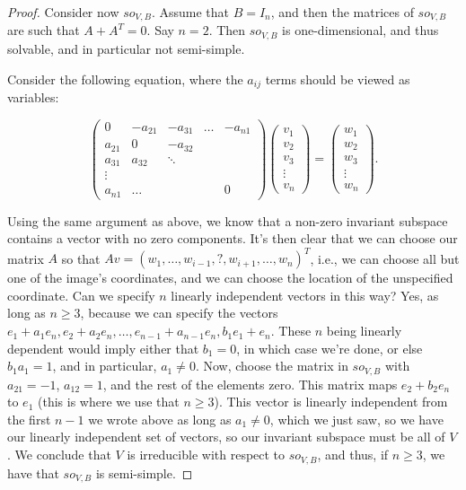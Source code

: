 \documentclass{amsart}
\begin{document}
\begin{proof}
Consider now $so_{V,B}$.  Assume that $B = I_{n}$, and then the
matrices of $so_{V,B}$ are such that $A + A^{T} = 0$.  Say $n=2$.
Then $so_{V,B}$ is one-dimensional, and thus solvable, and in
particular not semi-simple.

Consider the
following equation, where the $a_{ij}$ terms should be viewed as
variables:

$$\left( \begin{array}{ccccc}
0 & -a_{21} & -a_{31} & \ldots &- a_{n1} \\ 
a_{21} & 0 & -a_{32} & &\\
a_{31} & a_{32} & \ddots & &\\ 
\vdots & & & & \\ 
a_{n1} & \ldots & & & 0
\end{array}\right) \left( \begin{array}{c}
v_{1} \\
v_{2} \\
v_{3} \\
\vdots \\
v_{n} \end{array}\right) = \left( \begin{array}{c}
w_{1} \\
w_{2} \\
w_{3} \\
\vdots \\
w_{n} \end{array}\right).$$

Using the same argument as above, we know that a non-zero
invariant subspace contains a vector with no zero components.  It's
then clear that we can choose our matrix $A$ so that $Av = (w_{1},
\ldots, w_{i-1},?,w_{i+1},\ldots,w_{n})^{T}$, i.e., we can choose all
but one of the image's coordinates, and we can choose the location of
the unspecified coordinate.  Can we specify $n$ linearly independent
vectors in this way?  Yes, as long as $n \geq 3$, because we can
specify the vectors $e_{1} + a_{1}e_{n}, e_{2} + a_{2}e_{n}, \ldots,
e_{n-1} + a_{n-1}e_{n}, b_{1}e_{1} + e_{n}$.  These
$n$ being linearly dependent would imply either that 
$b_{1} = 0$, in which case we're done, or else $b_{1}a_{1} = 1$,
and in particular, $a_{1} \neq 0$.  Now, choose the matrix in $so_{V,B}$ with 
$a_{21}=-1$, 
$a_{12} = 1$, and the rest of the elements zero.  This matrix maps
$e_{2}+b_{2}e_{n}$ to $e_{1}$ (this is where we use that $n \geq 3$).  
This vector is linearly independent from the 
first $n-1$ we wrote above as long as $a_{1} \neq 0$, which we just saw, 
so we have our linearly independent set of vectors, so our invariant
subspace must be all of $V$.
We conclude that $V$ is irreducible with respect to
$so_{V,B}$, and thus, if $n \geq 3$, we have that $so_{V,B}$ is semi-simple.

\end{proof}
\end{document}
